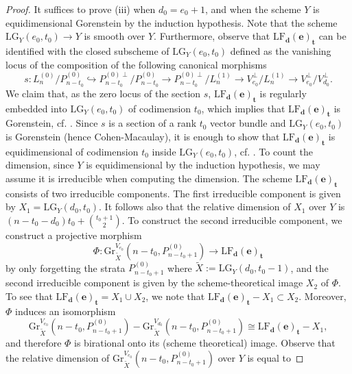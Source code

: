 \documentclass[a4paper]{amsart}
\theoremstyle{plain}
\theoremstyle{definition}
\numberwithin{equation}{section}
\newcommand{\Gr}{\mathrm{Gr}}
\newcommand{\LG}{\mathrm{LG}}
\begin{document}
\begin{proof}
    It suffices to prove (iii) when $d_0 = e_0 +1 $, and when the scheme $Y$ is equidimensional Gorenstein by the induction hypothesis.
    Note that the scheme
    $\LG_Y(e_0,t_0) \to Y$ is smooth over $Y$.
    Furthermore, observe that $\mathrm{LF}_{\mathbf{d}}(\mathbf{e})_{\mathbf{t}}$ can be identified with the closed subscheme of $\LG_Y(e_0,t_0) $ defined as the vanishing locus of the composition of the following canonical morphisms
    \begin{equation}\label{eq:section-s}
        s: L_n^{(0)}/P_{n-t_0}^{(0)} \hookrightarrow P_{n-t_0}^{(0)\perp} / P_{n-t_0}^{(0)} \to   P_{n-t_0}^{(0)\perp}/L_n^{(1)} \to V_{e_0}^\perp/L_n^{(1)} \to V_{e_0}^\perp/V_{d_0}^\perp.
    \end{equation}
    We claim that, as the zero locus of the section $s$, $\mathrm{LF}_{\mathbf{d}}(\mathbf{e})_{\mathbf{t}}$ is regularly embedded into $\LG_Y(e_0,t_0)$ of codimension $t_0$, which implies that $\mathrm{LF}_{\mathbf{d}}(\mathbf{e})_{\mathbf{t}}$ is Gorenstein, cf. \cite[Proposition 3.1.19(b)]{bruns1993cohen}. Since $s$ is a section of a rank $t_0$ vector bundle and $\LG_Y(e_0,t_0)$ is Gorenstein (hence Cohen-Macaulay), it is enough to show that  $\mathrm{LF}_{\mathbf{d}}(\mathbf{e})_{\mathbf{t}}$ is equidimensional of codimension $t_0$ inside $\LG_Y(e_0,t_0)$, cf. \cite[Theorem 2.1.2(c)]{bruns1993cohen}. To count the dimension, since $Y$ is equidimensional by the induction hypothesis, we may assume it is irreducible when computing the dimension. The scheme $\mathrm{LF}_{\mathbf{d}}(\mathbf{e})_{\mathbf{t}}$ consists of two irreducible components. The first irreducible component is given by $X_1 = \LG_Y(d_0,t_0)$.  It follows also that the relative dimension of $X_1$ over $Y$ is $(n - t_0-d_0)t_0 + \binom{t_{0}+1}{2}$. To construct the second irreducible component, we construct a projective  morphism
    $$ \Phi: \Gr^{V_{e_0}}_{\widetilde{X}}(n-t_0, P_{n-t_0+1}^{(0)}) \to  \mathrm{LF}_{\mathbf{d}}(\mathbf{e})_{\mathbf{t}} $$
    by only forgetting the strata $P^{(0)}_{n-t_0+1}$ where $\widetilde{X}:= \LG_Y(d_0,t_0-1)$, and the second irreducible component is given by the scheme-theoretical image $X_2$ of $\Phi$.
    To see that $\mathrm{LF}_{\mathbf{d}}(\mathbf{e})_{\mathbf{t}} = X_1 \cup X_2$, we note that $\mathrm{LF}_{\mathbf{d}}(\mathbf{e})_{\mathbf{t}} - X_1 \subset X_2$. Moreover, $\Phi$ induces an isomorphism
    \[ \Gr^{V_{e_0}}_{\widetilde{X}}(n-t_0, P_{n-t_0+1}^{(0)})  - \Gr_{\widetilde{X}}^{V_{d_0}}(n-t_0, P_{n-t_0+1}^{(0)}) \cong  \mathrm{LF}_{\mathbf{d}}(\mathbf{e})_{\mathbf{t}} - X_1, \] and therefore $\Phi$ is birational onto its (scheme theoretical) image. Observe that the relative dimension of $\Gr^{V_{e_0}}_{\widetilde{X}}(n-t_0, P_{n-t_0+1}^{(0)}) $ over $Y$ is equal to

\end{proof}
\end{document}
